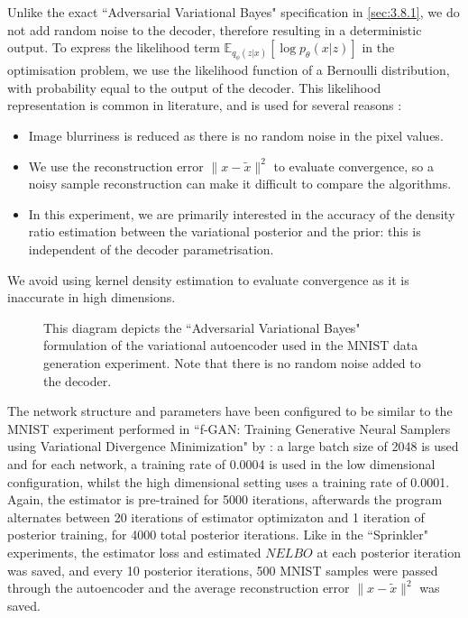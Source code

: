 \documentclass[honours,12pt]{unswthesis}
\newcommand{\E}{\mathbb{E}}
\numberwithin{equation}{section}
\theoremstyle{definition}
\begin{document}
Unlike the exact ``Adversarial Variational Bayes" specification in \autoref{sec:3.8.1}, we do not add random noise to the decoder, therefore resulting in a deterministic output. To express the likelihood term $\E_{q_\phi(z|x)}[\log p_\theta(x|z)]$ in the optimisation problem, we use the likelihood function of a Bernoulli distribution, with probability equal to the output of the decoder. This likelihood representation is common in literature, and is used for several reasons \citep{nowozin,bgan, tiao}:
\begin{itemize}
\item Image blurriness is reduced as there is no random noise in the pixel values.
\item We use the reconstruction error $\|x-\tilde{x}\|^2$ to evaluate convergence, so a noisy sample reconstruction can make it difficult to compare the algorithms.
\item In this experiment, we are primarily interested in the accuracy of the density ratio estimation between the variational posterior and the prior: this is independent of the decoder parametrisation.
\end{itemize}
We avoid using kernel density estimation to evaluate convergence as it is inaccurate in high dimensions.
\begin{figure}[h]
  \centering
   \caption{\small This diagram depicts the ``Adversarial Variational Bayes" formulation of the variational autoencoder used in the MNIST data generation experiment. Note that there is no random noise added to the decoder.}
\end{figure}

The network structure and parameters have been configured to be similar to the MNIST experiment performed in ``f-GAN: Training Generative Neural Samplers using Variational Divergence Minimization" by \citet{nowozin}: a large batch size of 2048 is used and for each network, a training rate of 0.0004 is used in the low dimensional configuration, whilst the high dimensional setting uses a training rate of 0.0001. Again, the estimator is pre-trained for 5000 iterations, afterwards the program alternates between 20 iterations of estimator optimizaton and 1 iteration of posterior training, for 4000 total posterior iterations. Like in the ``Sprinkler" experiments, the estimator loss and estimated $NELBO$ at each posterior iteration was saved, and every 10 posterior iterations, 500 MNIST samples were passed through the autoencoder and the average reconstruction error $\|x-\tilde{x}\|^2$ was saved.
\end{document}
